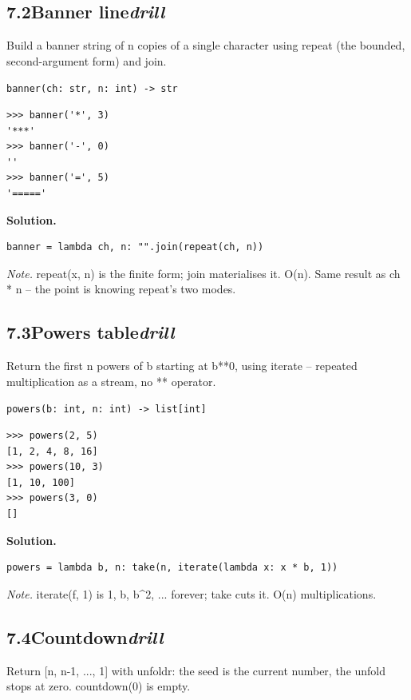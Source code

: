 \documentclass[10pt,letterpaper]{book}
\begin{document}

\subsection*{7.2\quad Banner line\hfill\textnormal{\textit{drill}}}
Build a banner string of n copies of a single character using repeat (the bounded, second-argument form) and join.

\noindent\texttt{banner(ch: str, n: int) -> str}
\begin{lstlisting}[style=ex]
>>> banner('*', 3)
'***'
>>> banner('-', 0)
''
>>> banner('=', 5)
'====='
\end{lstlisting}
\noindent\textbf{Solution.}
\begin{lstlisting}[style=code]
banner = lambda ch, n: "".join(repeat(ch, n))
\end{lstlisting}
\noindent\textit{Note.} repeat(x, n) is the finite form; join materialises it. O(n). Same result as ch * n -- the point is knowing repeat's two modes.

\subsection*{7.3\quad Powers table\hfill\textnormal{\textit{drill}}}
Return the first n powers of b starting at b**0, using iterate -- repeated multiplication as a stream, no ** operator.

\noindent\texttt{powers(b: int, n: int) -> list[int]}
\begin{lstlisting}[style=ex]
>>> powers(2, 5)
[1, 2, 4, 8, 16]
>>> powers(10, 3)
[1, 10, 100]
>>> powers(3, 0)
[]
\end{lstlisting}
\noindent\textbf{Solution.}
\begin{lstlisting}[style=code]
powers = lambda b, n: take(n, iterate(lambda x: x * b, 1))
\end{lstlisting}
\noindent\textit{Note.} iterate(f, 1) is 1, b, b\^{}2, ... forever; take cuts it. O(n) multiplications.


\subsection*{7.4\quad Countdown\hfill\textnormal{\textit{drill}}}
Return [n, n-1, ..., 1] with unfoldr: the seed is the current number, the unfold stops at zero. countdown(0) is empty.
\end{document}
